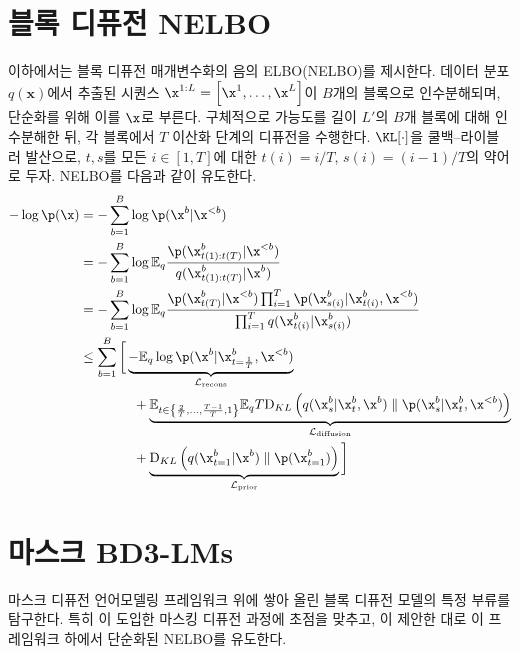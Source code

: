 \documentclass{article} %
\def\algos{BD3-LMs}
\begin{document}
\section{블록 디퓨전 NELBO}\label{suppl:diffusion-nelbo}
이하에서는 블록 디퓨전 매개변수화의 음의 ELBO(NELBO)를 제시한다. 데이터 분포 $q(\mathbf{x})$에서 추출된 시퀀스 $\x^{1:L} = \left[ \x^1, \dots, \x^L \right]$이 $B$개의 블록으로 인수분해되며, 단순화를 위해 이를 $\x$로 부른다. 구체적으로 가능도를 길이 $L'$의 $B$개 블록에 대해 인수분해한 뒤, 각 블록에서 $T$ 이산화 단계의 디퓨전을 수행한다. $\KL[\cdot]$을 쿨백–라이블러 발산으로, $t, s$를 모든 $i \in [1, T]$에 대한 $t(i) = i / T$, $s(i) = (i - 1)/T$의 약어로 두자. NELBO를 다음과 같이 유도한다.
\begin{align}\label{eq:nelbo-bd}
    - \log \p(\x) &= - \sum_{b = 1}^{B} \log \p(\x^{b} | \x^{<b}) \nonumber \\
    &=  - \sum_{b = 1}^{B} \log \mathbb{E}_{q} \frac{\p(\x^{b}_{t(1):t(T)} | \x^{<b})}{q(\x^{b}_{t(1):t(T)} | \x^{b})} \nonumber \\
    &=  - \sum_{b = 1}^{B} \log \mathbb{E}_{q}   \frac{ \p(\x^{b}_{t(T)}| \x^{<b}) \prod_{i=1}^T \p(\x^{b}_{s(i)}| \x^{b}_{t(i)}, \x^{<b})}{ \prod_{i=1}^T q(\x^{b}_{t(i)} | \x^{b}_{s(i)})} \nonumber \\
    &\leq \sum_{b = 1}^{B} \bigg[ \underbrace{- \mathbb{E}_{q} \log \p(\x^{b} | \x_{t = \frac{1}{T}}^{b}, \x^{<b})}_{\mathcal{L}_{\text{recons}}} \notag \\
    & \hspace{4em} + \underbrace{\mathbb{E}_{t \in \left\{ \frac{2}{T}, \dots, \frac{T - 1}{T}, 1 \right\}}  \mathbb{E}_{q} T  
      \text{D}_{KL}\left( q(\x^{b}_{s} | \x^{b}_{t}, \x^{b}) \parallel 
      \p(\x^{b}_{s}| \x^{b}_{t}, \x^{<b})\right)}_{\mathcal{L}_{\text{diffusion}}} \notag \\
    & \hspace{4em} + \underbrace{\text{D}_{KL} \left( q(\x^{b}_{t=1} | \x^{b}) \parallel \p(\x^{b}_{t=1}) \right)}_{\mathcal{L}_{\text{prior}}} \bigg ] 
\end{align}


\section{마스크 \algos{}}

마스크 디퓨전 언어모델링 프레임워크 위에 쌓아 올린 블록 디퓨전 모델의 특정 부류를 탐구한다. 특히 \citet{austin2021structured}이 도입한 마스킹 디퓨전 과정에 초점을 맞추고, \citet{sahoo2024simple, shi2024simplified, ou2025your}이 제안한 대로 이 프레임워크 하에서 단순화된 NELBO를 유도한다.
\end{document}
